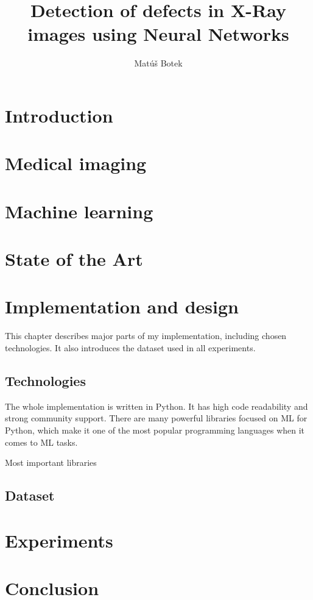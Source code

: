\documentclass[thesis=B,english]{FITthesis}[2019/12/23]
\title{Detection of defects in X-Ray images using Neural Networks}
\author{Matúš Botek} %
\begin{document}

\chapter{Introduction}



\chapter{Medical imaging}


\chapter{Machine learning}


\chapter{State of the Art}


\chapter{Implementation and design}
This chapter describes major parts of my implementation, including chosen technologies. It also introduces the dataset used in all experiments.

\section{Technologies}
The whole implementation is written in Python. It has high code readability and strong community support. There are many powerful libraries focused on ML for Python, which make it one of the most popular programming languages when it comes to ML tasks.

Most important libraries


\section{Dataset}

\chapter{Experiments}

\chapter{Conclusion}
\end{document}
